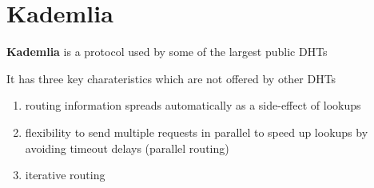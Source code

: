 \chapter{Kademlia}
\textbf{Kademlia} is a protocol used by some of the largest public DHTs
{It has three key charateristics which are not offered by other DHTs\ns
\begin{enumerate}
   \item routing information spreads automatically as a side-effect of lookups
   \item flexibility to send multiple requests in parallel to speed up lookups by
   avoiding timeout delays (parallel routing)
   \item iterative routing
\end{enumerate}}

